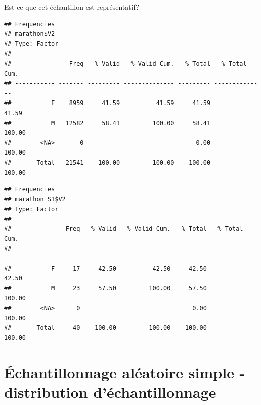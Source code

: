 \documentclass[ignorenonframetext,]{beamer}
\newenvironment{Shaded}{\begin{snugshade}}{\end{snugshade}}
\newcommand{\KeywordTok}[1]{\textcolor[rgb]{0.13,0.29,0.53}{\textbf{#1}}}
\newcommand{\OperatorTok}[1]{\textcolor[rgb]{0.81,0.36,0.00}{\textbf{#1}}}
\newcommand{\NormalTok}[1]{#1}
\begin{document}
\begin{frame}[fragile]{Est-ce que cet échantillon est représentatif?}

\begin{Shaded}
\end{Shaded}

\begin{verbatim}
## Frequencies  
## marathon$V2  
## Type: Factor  
## 
##                Freq   % Valid   % Valid Cum.   % Total   % Total Cum.
## ----------- ------- --------- -------------- --------- --------------
##           F    8959     41.59          41.59     41.59          41.59
##           M   12582     58.41         100.00     58.41         100.00
##        <NA>       0                               0.00         100.00
##       Total   21541    100.00         100.00    100.00         100.00
\end{verbatim}

\begin{Shaded}
\end{Shaded}

\begin{verbatim}
## Frequencies  
## marathon_S1$V2  
## Type: Factor  
## 
##               Freq   % Valid   % Valid Cum.   % Total   % Total Cum.
## ----------- ------ --------- -------------- --------- --------------
##           F     17     42.50          42.50     42.50          42.50
##           M     23     57.50         100.00     57.50         100.00
##        <NA>      0                               0.00         100.00
##       Total     40    100.00         100.00    100.00         100.00
\end{verbatim}

\end{frame}

\section{Échantillonnage aléatoire simple - distribution
d'échantillonnage}\label{uxe9chantillonnage-aluxe9atoire-simple---distribution-duxe9chantillonnage}
\end{document}
